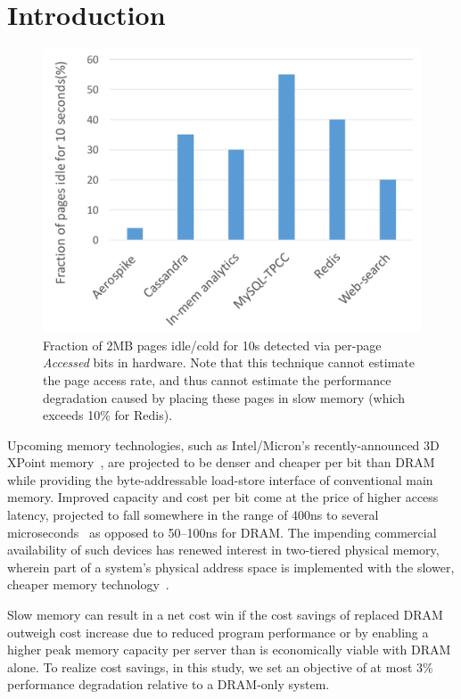 \section{Introduction}
\label{asplos2017-introduction}

\begin{figure}[t]
\centering
\includegraphics[width=1.0\columnwidth]{asplos2017/figures/kstaled-cold-data-10s}
\caption{Fraction of 2MB pages idle/cold for 10s detected via per-page {\it Accessed} bits
in hardware. Note that this technique cannot estimate the page access rate, and
thus cannot estimate the performance degradation caused by placing
these pages in slow memory (which exceeds 10\% for Redis).}
\label{fig:motivation}
\end{figure}


Upcoming memory technologies, such as Intel/Micron's recently-announced 3D XPoint
memory~\cite{3dcrosspoint}, are projected to be denser and cheaper per bit than DRAM while
providing the byte-addressable load-store interface of conventional main memory.
Improved capacity and cost per bit come at the price of higher access latency,
projected to fall somewhere in the range of 400ns to several
microseconds~\cite{3dcrosspoint} as opposed to 50--100ns for DRAM. The impending commercial availability of such
devices has renewed interest in two-tiered physical memory, wherein part of a
system's physical address space is implemented with the slower, cheaper memory
technology~\cite{ref:Dulloor:datatiering,qureshi:twolm}.  

Slow memory can result in a net cost win if the cost savings of
replaced DRAM outweigh cost increase due to reduced program performance or by
enabling a higher peak memory capacity per server than is economically viable
with DRAM alone. 
To realize cost savings,
in this study, we set an objective of at most 3\% performance degradation relative to a DRAM-only system.



